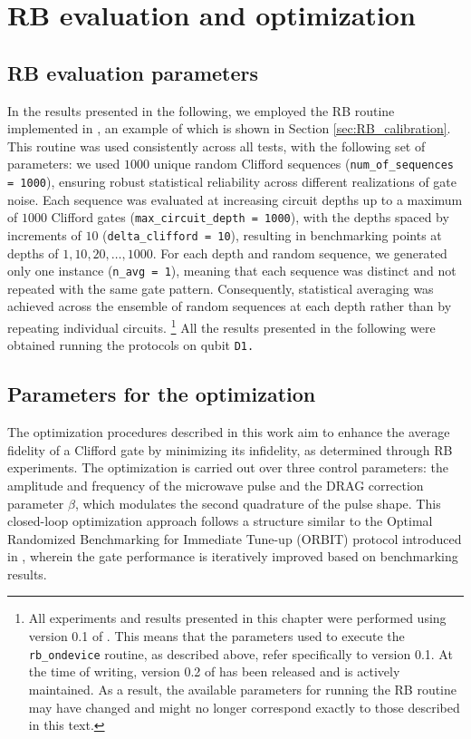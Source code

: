 \section{RB evaluation and optimization}

\subsection{RB evaluation parameters}\label{sec:RB_parameters}
In the results presented in the following, we employed the RB routine implemented in \Qibocal, an example of which is shown in Section \ref{sec:RB_calibration}. 
This routine was used consistently across all tests, with the following set of parameters: we used $1000$ unique random Clifford sequences (\texttt{num\_of\_sequences = 1000}), ensuring robust statistical reliability across different realizations of gate noise. 
Each sequence was evaluated at increasing circuit depths up to a maximum of $1000$ Clifford gates (\texttt{max\_circuit\_depth = 1000}), with the depths spaced by increments of $10$ (\texttt{delta\_clifford = 10}), resulting in benchmarking points at depths of $1, 10, 20, \ldots, 1000$. 
For each depth and random sequence, we generated only one instance (\texttt{n\_avg = 1}), meaning that each sequence was distinct and not repeated with the same gate pattern. 
Consequently, statistical averaging was achieved across the ensemble of random sequences at each depth rather than by repeating individual circuits. 
\footnote{All experiments and results presented in this chapter were performed using version 0.1 of \Qibocal. This means that the parameters used to execute the \texttt{rb\_ondevice} routine, as described above, refer specifically to version 0.1. At the time of writing, version 0.2 of \Qibocal has been released and is actively maintained. As a result, the available parameters for running the RB routine may have changed and might no longer correspond exactly to those described in this text.}
All the results presented in the following were obtained running the protocols on qubit \tt{D1}.

\subsection{Parameters for the optimization}
The optimization procedures described in this work aim to enhance the average fidelity of a Clifford gate by minimizing its infidelity, as determined through RB experiments. 
The optimization is carried out over three control parameters: the amplitude and frequency of the microwave pulse and the DRAG correction parameter $\beta$, which modulates the second quadrature of the pulse shape. 
This closed-loop optimization approach follows a structure similar to the Optimal Randomized Benchmarking for Immediate Tune-up (ORBIT) protocol introduced in \cite{kelly_optimal_2014}, wherein the gate performance is iteratively improved based on benchmarking results.

